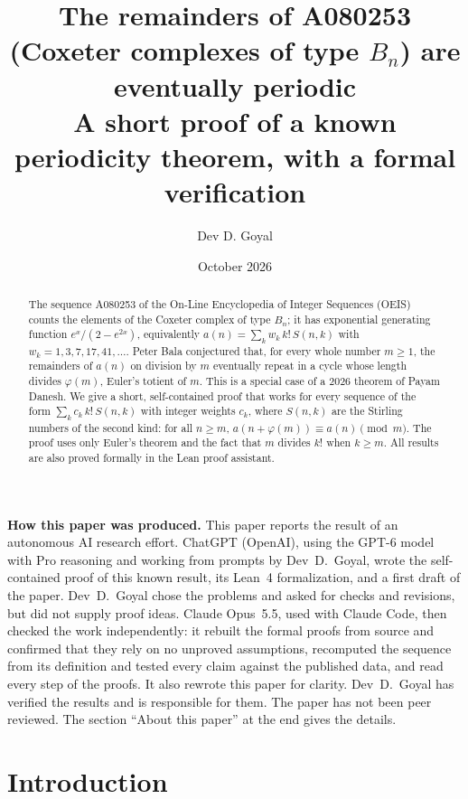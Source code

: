 \documentclass[11pt,a4paper]{article}
\title{The remainders of A080253 (Coxeter complexes of type $B_n$) are eventually periodic\\[6pt]\large A short proof of a known periodicity theorem, with a formal verification}
\author{Dev D. Goyal}
\date{October 2026}
\theoremstyle{definition}
\theoremstyle{remark}
\begin{document}
\maketitle
\begin{abstract}
The sequence A080253 of the On-Line Encyclopedia of Integer Sequences (OEIS) counts the elements of the Coxeter complex of type $B_n$; it has exponential generating function $e^x/(2-e^{2x})$, equivalently $a(n)=\sum_kw_k\,k!\,S(n,k)$ with $w_k=1,3,7,17,41,\dots$. Peter Bala conjectured that, for every whole number $m\ge1$, the remainders of $a(n)$ on
division by $m$ eventually repeat in a cycle whose length divides $\varphi(m)$, Euler's totient of $m$. This is a special
case of a 2026 theorem of Payam Danesh. We give a short, self-contained proof that works for every sequence of the form
$\sum_k c_k\,k!\,S(n,k)$ with integer weights $c_k$, where $S(n,k)$ are the Stirling numbers of the second kind: for all
$n\ge m$, $a(n+\varphi(m))\equiv a(n)\pmod m$. The proof uses only Euler's theorem and the fact that $m$ divides $k!$
when $k\ge m$. All results are also proved formally in the Lean proof assistant.
\end{abstract}
\begin{center}\begin{minipage}{0.88\linewidth}\small
\textbf{How this paper was produced.} This paper reports the result of an autonomous AI research effort.
ChatGPT (OpenAI), using the GPT-6 model with Pro reasoning and working from prompts by Dev~D.~Goyal, wrote the self-contained proof of this known result, its Lean~4 formalization, and a first draft of the paper.
Dev~D.~Goyal chose the problems and asked for checks and revisions, but did not supply proof ideas.
Claude Opus~5.5, used with Claude Code, then checked the work independently: it rebuilt the formal proofs from
source and confirmed that they rely on no unproved assumptions, recomputed the sequence from its definition and tested
every claim against the published data, and read every step of the proofs. It also rewrote this paper for clarity.
Dev~D.~Goyal has verified the results and is responsible for them. The paper has not been peer reviewed.
The section ``About this paper'' at the end gives the details.
\end{minipage}\end{center}

\section{Introduction}
\end{document}
